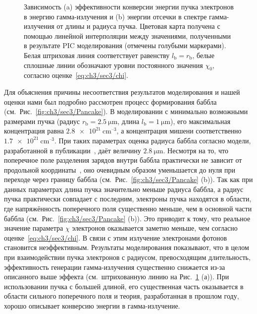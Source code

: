 \begin{figure}[ht]
    \caption[Зависимость эффективности конверсии энергии пучка электронов в энергию гамма-излучения и энергии отсечки в спектре гамма-излучения от длины и радиуса пучка]{Зависимость (a) эффективности конверсии энергии пучка электронов в энергию гамма-излучения и (b) энергии отсечки в спектре гамма-излучения от длины и радиуса пучка.
    Цветовая карта получена с помощью линейной интерполяции между значениями, полученными в результате PIC моделирования (отмечены голубыми маркерами).
    Белая штриховая линия соответствует равенству $l_\mathrm{b} = r_\mathrm{b}$, белые сплошные линии обозначают уровни постоянного значения $\chi_0$, согласно оценке~\eqref{eq:ch3/sec3/chi}.}
    \label{fig:ch3/sec3/Efficiency}
\end{figure}

Для объяснения причины несоответствия результатов моделирования и нашей оценки нами был подробно рассмотрен процесс формирования баббла (см.~Рис.~\ref{fig:ch3/sec3/Pancake}).
В моделировании с минимально возможными размерами пучка (радиус $r_\mathrm{b} = \SI{2.5}{\um}$, длина $l_\mathrm{b} = \SI{1}{\um}$), его максимальная концентрация равна $\SI{2.8e21}{\centi\meter^{–3}}$, а концентрация мишени соответственно $\SI{1.7e21}{\centi\meter^{–3}}$.
При таких параметрах оценка радиуса баббла согласно модели, разработанной в публикации~\cite{golovanov2021excitation}, даёт величину $\SI{2.8}{\um}$.
Несмотря на то, что поперечное поле разделения зарядов внутри баббла практически не зависит от продольной координаты~\cite{kostyukov2004phenomenological}, оно очевидным образом уменьшается до нуля при переходе через границу баббла (см.~Рис.~\ref{fig:ch3/sec3/Pancake} (b)).
Так как при данных параметрах длина пучка значительно меньше радиуса баббла, а радиус пучка практически совпадает с последним, электроны пучка находятся в области, где напряжённость поперечного поля существенно меньше, чем в основной части баббла (см.~Рис.~\ref{fig:ch3/sec3/Pancake} (b)).
Это приводит к тому, что реальное значение параметра $\chi$ электронов оказывается заметно меньше, чем согласно оценке~\eqref{eq:ch3/sec3/chi}.
В связи с этим излучение электронами фотонов становится неэффективным.
Результаты моделирования показывают, что в целом при взаимодействии пучка электронов с радиусом, превосходящим длительность, эффективность генерации гамма-излучения существенно снижается из-за описанного выше эффекта (см.~штрихованную линию на Рис.~\ref{fig:ch3/sec3/Efficiency} (а)).
При использовании пучка с большей длиной, его существенная часть оказывается в области сильного поперечного поля и теория, разработанная в прошлом году, хорошо описывает конверсию энергии в гамма-излучение. 

